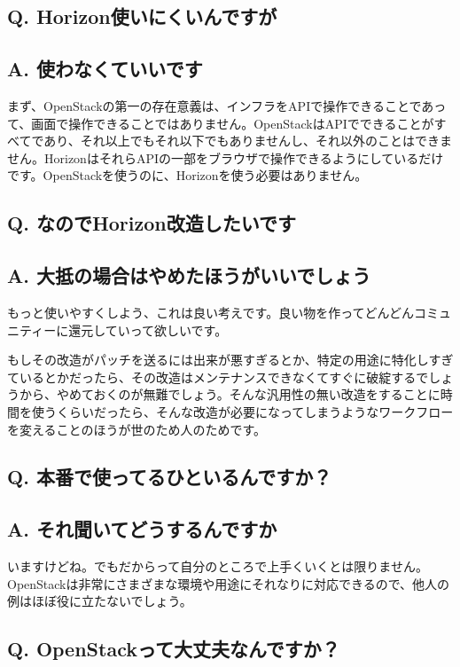 \documentclass[9pt,b5paper,tombo,openany]{jsbook}
\begin{document}
\subsection*{{\LARGE\bfseries Q.} Horizon使いにくいんですが}
\subsection*{{\LARGE\bfseries A.} 使わなくていいです}
まず、OpenStackの第一の存在意義は、インフラをAPIで操作できることであって、画面で操作できることではありません。OpenStackはAPIでできることがすべてであり、それ以上でもそれ以下でもありませんし、それ以外のことはできません。HorizonはそれらAPIの一部をブラウザで操作できるようにしているだけです。OpenStackを使うのに、Horizonを使う必要はありません。

\subsection*{{\LARGE\bfseries Q.} なのでHorizon改造したいです}
\subsection*{{\LARGE\bfseries A.} 大抵の場合はやめたほうがいいでしょう}
もっと使いやすくしよう、これは良い考えです。良い物を作ってどんどんコミュニティーに還元していって欲しいです。

もしその改造がパッチを送るには出来が悪すぎるとか、特定の用途に特化しすぎているとかだったら、その改造はメンテナンスできなくてすぐに破綻するでしょうから、やめておくのが無難でしょう。そんな汎用性の無い改造をすることに時間を使うくらいだったら、そんな改造が必要になってしまうようなワークフローを変えることのほうが世のため人のためです。

\subsection*{{\LARGE\bfseries Q.} 本番で使ってるひといるんですか？}
\subsection*{{\LARGE\bfseries A.} それ聞いてどうするんですか}
いますけどね。でもだからって自分のところで上手くいくとは限りません。OpenStackは非常にさまざまな環境や用途にそれなりに対応できるので、他人の例はほぼ役に立たないでしょう。

\subsection*{{\LARGE\bfseries Q.} OpenStackって大丈夫なんですか？}
\end{document}
